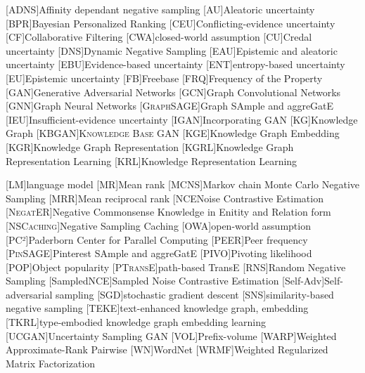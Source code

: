 \begin{acronym}[ECU]
[\textsc{ADNS}]{Affinity dependant negative sampling}
[AU]{Aleatoric uncertainty}
[BPR]{Bayesian Personalized Ranking}
[CEU]{Conflicting-evidence uncertainty}
[CF]{Collaborative Filtering}
[CWA]{closed-world assumption}
[CU]{Credal uncertainty}
[DNS]{Dynamic Negative Sampling}
[EAU]{Epistemic and aleatoric uncertainty}
[EBU]{Evidence-based uncertainty}
[ENT]{entropy-based uncertainty}
[EU]{Epistemic uncertainty}
[\textsc{FB}]{Freebase}
[\textsc{FRQ}]{Frequency of the Property}
[GAN]{Generative Adversarial Networks}
[GCN]{Graph Convolutional Networks}
[GNN]{Graph Neural Networks}
[\textsc{GraphSAGE}]{Graph SAmple and aggreGatE}
[IEU]{Insufficient-evidence uncertainty}
[\textsc{IGAN}]{Incorporating GAN}
[KG]{Knowledge Graph}
[\textsc{KBGAN}]{\textsc{Knowledge Base GAN}}
[KGE]{Knowledge Graph Embedding}
[KGR]{Knowledge Graph Representation}
[KGRL]{Knowledge Graph Representation Learning}
[KRL]{Knowledge Representation Learning}

[LM]{language model}
[MR]{Mean rank}
[\textsc{MCNS}]{Markov chain Monte Carlo Negative Sampling}
[MRR]{Mean reciprocal rank}
[NCE{Noise Contrastive Estimation}
[\textsc{NegatER}]{Negative Commonsense Knowledge in Enitity and Relation form}
[\textsc{NSCaching}]{Negative Sampling Caching}
[OWA]{open-world assumption}
[PC²]{Paderborn Center for Parallel Computing}
[\textsc{PEER}]{Peer frequency}
[\textsc{PinSAGE}]{Pinterest SAmple and aggreGatE}
[\textsc{PIVO}]{Pivoting likelihood}
[\textsc{POP}]{Object popularity}
[\textsc{PTransE}]{path-based TransE}
[RNS]{Random Negative Sampling}
[SampledNCE]{Sampled Noise Contrastive Estimation}
[Self-Adv]{Self-adversarial sampling}
[SGD]{stochastic gradient descent}
[SNS]{similarity-based negative sampling}
[\textsc{TEKE}]{text-enhanced knowledge graph, embedding}
[\textsc{TKRL}]{type-embodied knowledge graph embedding learning}
[\textsc{UCGAN}]{Uncertainty Sampling GAN}
[\textsc{VOL}]{Prefix-volume}
[WARP]{Weighted Approximate-Rank Pairwise}
[\textsc{WN}]{WordNet}
[WRMF]{Weighted Regularized Matrix Factorization}

\end{acronym}